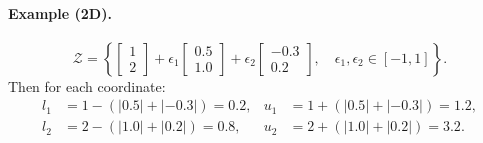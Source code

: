 \documentclass[oneside,11pt,dvipsnames]{book}
\numberwithin{equation}{section}
\theoremstyle{definition}
\theoremstyle{remark}
\begin{document}
\paragraph{Example (2D).}
\[
\mathcal{Z} =
\left\{
\begin{bmatrix} 1 \\ 2 \end{bmatrix}
+ \epsilon_1
\begin{bmatrix} 0.5 \\ 1.0 \end{bmatrix}
+ \epsilon_2
\begin{bmatrix} -0.3 \\ 0.2 \end{bmatrix},
\quad \epsilon_1, \epsilon_2 \in [-1,1]
\right\}.
\]
Then for each coordinate:
\[
\begin{aligned}
l_1 &= 1 - (|0.5| + |{-0.3}|) = 0.2, &
u_1 &= 1 + (|0.5| + |{-0.3}|) = 1.2,\\
l_2 &= 2 - (|1.0| + |0.2|) = 0.8, &
u_2 &= 2 + (|1.0| + |0.2|) = 3.2.
\end{aligned}
\]








\end{document}
